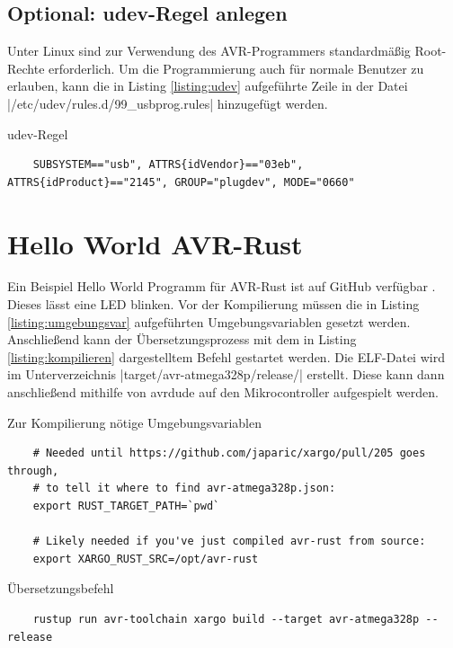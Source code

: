 \documentclass
[ 12pt,
  parskip=half %
]{scrreprt}
\newenvironment{mylisting}[1][H]
{\captionsetup{aboveskip=-0.2\normalbaselineskip}\begin{listing}[#1]}
{\end{listing}}
\begin{document}
\subsection{Optional: udev-Regel anlegen}

Unter Linux sind zur Verwendung des AVR-Programmers standardmäßig Root-Rechte erforderlich. Um die Programmierung auch für normale Benutzer zu erlauben, kann die in Listing \ref{listing:udev} aufgeführte Zeile in der Datei  \bashinline|/etc/udev/rules.d/99_usbprog.rules| hinzugefügt werden.

\begin{mylisting}
	\caption{udev-Regel}
	\label{listing:udev}
	\begin{verbatim}
	SUBSYSTEM=="usb", ATTRS{idVendor}=="03eb", ATTRS{idProduct}=="2145", GROUP="plugdev", MODE="0660"
	\end{verbatim}
\end{mylisting}

\newpage
\section{Hello World AVR-Rust}

Ein Beispiel Hello World Programm für AVR-Rust ist auf GitHub verfügbar \cite{github-avr-rust-blinky}. Dieses lässt eine LED blinken. Vor der Kompilierung müssen die in Listing \ref{listing:umgebungsvar} aufgeführten Umgebungsvariablen gesetzt werden. Anschließend kann der Übersetzungsprozess mit dem in Listing \ref{listing:kompilieren} dargestelltem Befehl gestartet werden. Die ELF-Datei wird im  Unterverzeichnis \bashinline|target/avr-atmega328p/release/| erstellt. Diese kann dann anschließend mithilfe von avrdude auf den Mikrocontroller aufgespielt werden.

\begin{mylisting}
	\caption{Zur Kompilierung nötige Umgebungsvariablen \cite{github-avr-rust-blinky}}
	\label{listing:umgebungsvar}
	\begin{verbatim}
	# Needed until https://github.com/japaric/xargo/pull/205 goes through,
	# to tell it where to find avr-atmega328p.json:
	export RUST_TARGET_PATH=`pwd`
	
	# Likely needed if you've just compiled avr-rust from source:
	export XARGO_RUST_SRC=/opt/avr-rust
	\end{verbatim}
\end{mylisting}

\begin{mylisting}
	\caption{Übersetzungsbefehl \cite{github-avr-rust-blinky}}
	\label{listing:kompilieren}
	\begin{verbatim}
	rustup run avr-toolchain xargo build --target avr-atmega328p --release
	\end{verbatim}
\end{mylisting}
\end{document}

